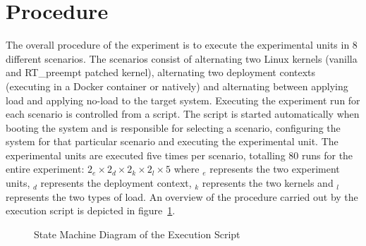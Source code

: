 \section{Procedure}%
The overall procedure of the experiment is to execute the experimental units in 8 different scenarios. The scenarios consist of alternating two Linux kernels (vanilla and RT\_preempt patched kernel), alternating two deployment contexts (executing in a Docker container or natively) and alternating between applying load and applying no-load to the target system. Executing the experiment run for each scenario is controlled from a  script. The script is started automatically when booting the system and is responsible for selecting a scenario, configuring the system for that particular scenario and executing the experimental unit. The experimental units are executed five times per scenario, totalling 80 runs for the entire experiment: \(2_{e} \times 2_{d} \times{} 2_{k}  \times{} 2_{l} \times{} 5 \) where $_{e}$ represents the two experiment units, $_{d}$ represents the deployment context, $_{k}$ represents the two kernels and $_{l}$ represents the two types of load. An overview of the procedure carried out by the execution script is depicted in figure~\ref{procedure-state}.


\begin{figure}[ht]
\centering
\caption{State Machine Diagram of the Execution Script }
\label{procedure-state}
\end{figure}

	

